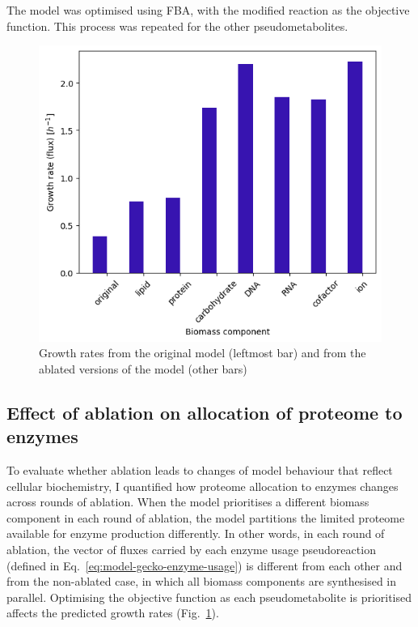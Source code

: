 The model was optimised using FBA, with the modified reaction as the objective function.
This process was repeated for the other pseudometabolites.

\begin{figure}
  \centering
  \includegraphics[width=.6\linewidth]{ablation_example_fluxes.png}
  \caption{
    Growth rates from the original model (leftmost bar) and from the ablated versions of the model (other bars)
  }
  \label{fig:model-ablate-fluxes}
\end{figure}


\subsection{Effect of ablation on allocation of proteome to enzymes}
\label{sec:model-yeast8-pseudometabolites-allocation}

To evaluate whether ablation leads to changes of model behaviour that reflect cellular biochemistry, I quantified how proteome allocation to enzymes changes across rounds of ablation.
When the model prioritises a different biomass component in each round of ablation, the model partitions the limited proteome available for enzyme production differently.
In other words, in each round of ablation, the vector of fluxes carried by each enzyme usage pseudoreaction (defined in Eq.\ \ref{eq:model-gecko-enzyme-usage}) is different from each other and from the non-ablated case, in which all biomass components are synthesised in parallel.
Optimising the objective function as each pseudometabolite is prioritised affects the predicted growth rates (Fig.\ \ref{fig:model-ablate-fluxes}).


